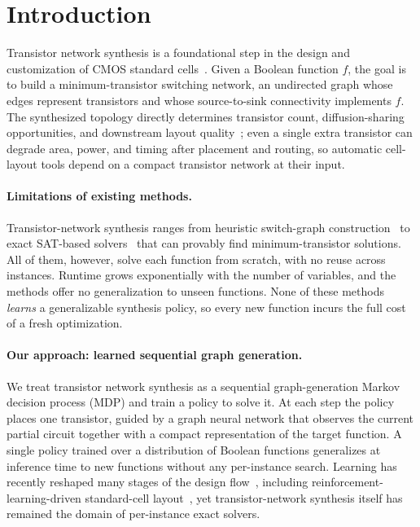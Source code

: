 \section{Introduction}
\label{sec:intro}

Transistor network synthesis is a foundational step in the design and
customization of CMOS standard cells~\cite{asap7,bonncell,nvcell}.
Given a Boolean function $f$, the goal is to build a minimum-transistor
switching network, an undirected graph whose edges represent transistors
and whose source-to-sink connectivity implements $f$.
The synthesized topology directly determines transistor count,
diffusion-sharing opportunities, and downstream layout
quality~\cite{switchcraft,bonncell};
even a single extra transistor can degrade area, power, and timing
after placement and routing, so automatic cell-layout tools depend on a
compact transistor network at their input.

\paragraph{Limitations of existing methods.}
Transistor-network synthesis ranges from heuristic switch-graph
construction~\cite{kagaris2007,switchcraft,motox} to exact SAT-based
solvers~\cite{muSTNet,miniTNtk} that can provably find
minimum-transistor solutions.
All of them, however, solve each function from scratch,
with no reuse across instances.
Runtime grows exponentially with the number of variables, and the methods
offer no generalization to unseen functions.
None of these methods \emph{learns} a generalizable synthesis policy,
so every new function incurs the full cost of a fresh optimization.

\paragraph{Our approach: learned sequential graph generation.}
We treat transistor network synthesis as a sequential
graph-generation Markov decision process (MDP) and train a policy
to solve it.
At each step the policy places one transistor, guided by a graph neural
network that observes the current partial circuit together with a
compact representation of the target function.
A single policy trained over a distribution of Boolean functions
generalizes at inference time to new functions without any per-instance
search.
Learning has recently reshaped many stages of the design
flow~\cite{mlforeda}, including reinforcement-learning-driven standard-cell
layout~\cite{nvcell}, yet transistor-network synthesis itself has remained
the domain of per-instance exact solvers.

